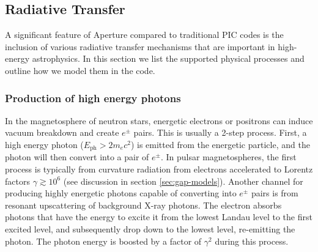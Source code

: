 

\subsection{Radiative Transfer}
\label{sec:radiative-transfer}

A significant feature of Aperture compared to traditional PIC codes is the
inclusion of various radiative transfer mechanisms that are important in
high-energy astrophysics. In this section we list the supported physical
processes and outline how we model them in the code.

\subsubsection{Production of high energy photons}
\label{sec:instant-pair}

In the magnetosphere of neutron stars, energetic electrons or positrons can
induce vacuum breakdown and create $e^{\pm}$ pairs. This is usually a 2-step
process. First, a high energy photon ($E_\mathrm{ph} > 2m_{e}c^2$) is emitted
from the energetic particle, and the photon will then convert into a pair of
$e^{\pm}$. In pulsar magnetospheres, the first process is typically from
curvature radiation from electrons accelerated to Lorentz factors $\gamma
\gtrsim 10^{6}$ (see discussion in section \ref{sec:gap-models}). Another
channel for producing highly energetic photons capable of converting into
$e^{\pm}$ pairs is from resonant upscattering of background X-ray photons. The
electron absorbs photons that have the energy to excite it from the lowest
Landau level to the first excited level, and subsequently drop down to the
lowest level, re-emitting the photon. The photon energy is boosted by a factor
of $\gamma^2$ during this process.

